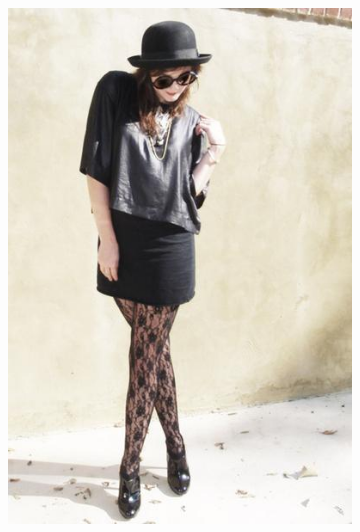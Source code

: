 \documentclass[12pt]{report}
\begin{document}
\begin{figure}
\begin{subfigure}[b]{0.2\textwidth}
    \caption{}
    \label{fig:2}
  \end{subfigure}
  
  \begin{subfigure}[b]{0.2\textwidth}
  \centering
    \includegraphics[scale=0.2]{images/paper3.jpg}
    \caption{}
    \label{fig:1}
  \end{subfigure}
  \begin{subfigure}[b]{0.2\textwidth}
  \centering

\end{subfigure}
\end{figure}
\end{document}
